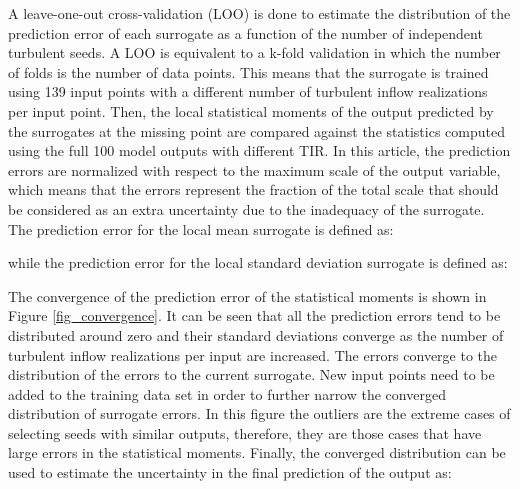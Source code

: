 \documentclass[preprint,12pt]{elsarticle}
\begin{document}
A leave-one-out cross-validation (LOO) is done to estimate the distribution of the prediction error of each surrogate as a function of the number of independent turbulent seeds. A LOO is equivalent to a k-fold validation in which the number of folds is the number of data points. This means that the surrogate is trained using 139 input points with a different number of turbulent inflow realizations per input point. Then, the local statistical moments of the output predicted by the surrogates at the missing point are compared against the statistics computed using the full 100 model outputs with different TIR. In this article, the prediction errors are normalized with respect to the maximum scale of the output variable, which means that the errors represent the fraction of the total scale that should be considered as an extra uncertainty due to the inadequacy of the surrogate. The prediction error for the local mean surrogate is defined as:


\noindent while the prediction error for the local standard deviation surrogate is defined as:




The convergence of the prediction error of the statistical moments is shown in Figure \ref{fig_convergence}. It can be seen that all the prediction errors tend to be distributed around zero and their standard deviations converge as the number of turbulent inflow realizations per input are increased. The errors converge to the distribution of the errors to the current surrogate. New input points need to be added to the training data set in order to further narrow the converged distribution of surrogate errors. In this figure the outliers are the extreme cases of selecting seeds with similar outputs, therefore, they are those cases that have large errors in the statistical moments. Finally, the converged distribution can be used to estimate the uncertainty in the final prediction of the output as:
\end{document}
